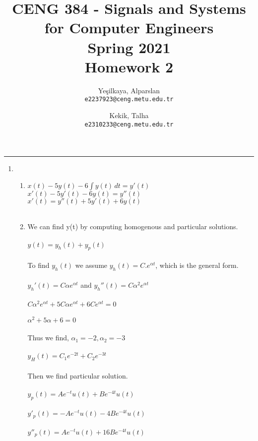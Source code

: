 \documentclass[10pt,a4paper, margin=1in]{article}
\author{
  Yeşilkaya, Alparslan\\
  \texttt{e2237923@ceng.metu.edu.tr}
  \and
  Kekik, Talha\\
  \texttt{e2310233@ceng.metu.edu.tr}
}
\title{CENG 384 - Signals and Systems for Computer Engineers \\
Spring 2021 \\
Homework 2}
\begin{document}
\maketitle



\noindent\rule{19cm}{1.2pt}

\begin{enumerate}

\item %
    \begin{enumerate}
    \item %
    $x(t)-5y(t)-6 \int y(t)\,dt=y'(t)$ \\
    $x'(t)-5y'(t)-6y(t)=y''(t)$ \\
    $x'(t)=y''(t)+5y'(t)+6y(t)$ \\ \\
    \item %
    We can find y(t) by computing homogenous  and particular solutions. \\ \\
    $y(t)=y_h(t)+y_p(t)$ \\ \\
    To find $y_h(t)$ we assume $y_h(t)=C.e^{\alpha t}$, which is the general form. \\ \\
    $y_h'(t)=C\alpha e^{\alpha t}$ and $y_h''(t)=C\alpha^2 e^{\alpha t}$ \\ \\
    $C\alpha^2 e^{\alpha t} + 5C\alpha e^{\alpha t} + 6Ce^{\alpha t}=0$ \\ \\
    $\alpha^2+5\alpha+6=0$ \\ \\
    Thus we find, $\alpha_1 = -2, \alpha_2 = -3$ \\ \\
    $y_H(t) = C_1e^{-2t} + C_2e^{-3t}$ \\ \\
    Then we find particular solution. \\ \\
    $y_p(t)=A e^{-t} u(t) + B e^{-4t} u(t)$ \\ \\
    $y'_p(t)=-A e^{-t} u(t) - 4B e^{-4t} u(t)$ \\ \\
    $y''_p(t)=A e^{-t} u(t) + 16B e^{-4t} u(t)$ \\ \\

\end{enumerate}
\end{enumerate}
\end{document}
